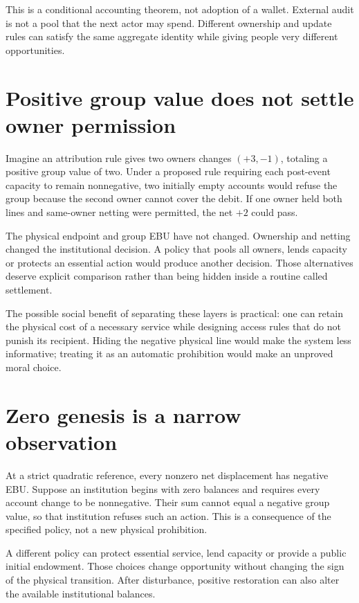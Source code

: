 This is a conditional accounting theorem, not adoption of a wallet. External audit is not a pool that the next actor may spend. Different ownership and update rules can satisfy the same aggregate identity while giving people very different opportunities.

\section{Positive group value does not settle owner permission}
Imagine an attribution rule gives two owners changes $(+3,-1)$, totaling a positive group value of two. Under a proposed rule requiring each post-event capacity to remain nonnegative, two initially empty accounts would refuse the group because the second owner cannot cover the debit. If one owner held both lines and same-owner netting were permitted, the net $+2$ could pass.

The physical endpoint and group EBU have not changed. Ownership and netting changed the institutional decision. A policy that pools all owners, lends capacity or protects an essential action would produce another decision. Those alternatives deserve explicit comparison rather than being hidden inside a routine called settlement.

The possible social benefit of separating these layers is practical: one can retain the physical cost of a necessary service while designing access rules that do not punish its recipient. Hiding the negative physical line would make the system less informative; treating it as an automatic prohibition would make an unproved moral choice.

\section{Zero genesis is a narrow observation}
At a strict quadratic reference, every nonzero net displacement has negative EBU. Suppose an institution begins with zero balances and requires every account change to be nonnegative. Their sum cannot equal a negative group value, so that institution refuses such an action. This is a consequence of the specified policy, not a new physical prohibition.

A different policy can protect essential service, lend capacity or provide a public initial endowment. Those choices change opportunity without changing the sign of the physical transition. After disturbance, positive restoration can also alter the available institutional balances.

